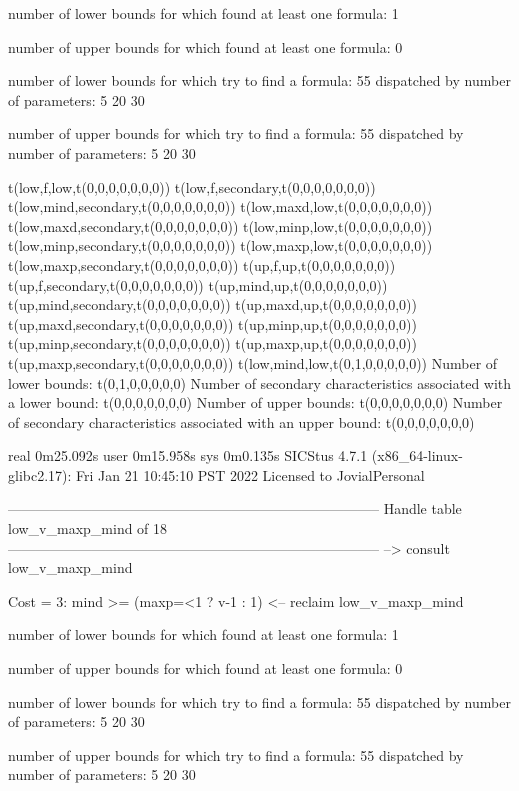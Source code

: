 number of lower bounds for which found at least one formula: 1

number of upper bounds for which found at least one formula: 0

number of lower bounds for which try to find a formula: 55
dispatched by number of parameters: 5  20  30

number of upper bounds for which try to find a formula: 55
dispatched by number of parameters: 5  20  30

t(low,f,low,t(0,0,0,0,0,0,0))
t(low,f,secondary,t(0,0,0,0,0,0,0))
t(low,mind,secondary,t(0,0,0,0,0,0,0))
t(low,maxd,low,t(0,0,0,0,0,0,0))
t(low,maxd,secondary,t(0,0,0,0,0,0,0))
t(low,minp,low,t(0,0,0,0,0,0,0))
t(low,minp,secondary,t(0,0,0,0,0,0,0))
t(low,maxp,low,t(0,0,0,0,0,0,0))
t(low,maxp,secondary,t(0,0,0,0,0,0,0))
t(up,f,up,t(0,0,0,0,0,0,0))
t(up,f,secondary,t(0,0,0,0,0,0,0))
t(up,mind,up,t(0,0,0,0,0,0,0))
t(up,mind,secondary,t(0,0,0,0,0,0,0))
t(up,maxd,up,t(0,0,0,0,0,0,0))
t(up,maxd,secondary,t(0,0,0,0,0,0,0))
t(up,minp,up,t(0,0,0,0,0,0,0))
t(up,minp,secondary,t(0,0,0,0,0,0,0))
t(up,maxp,up,t(0,0,0,0,0,0,0))
t(up,maxp,secondary,t(0,0,0,0,0,0,0))
t(low,mind,low,t(0,1,0,0,0,0,0))
Number of lower bounds:                                             t(0,1,0,0,0,0,0)
Number of secondary characteristics associated with a lower bound:  t(0,0,0,0,0,0,0)
Number of upper bounds:                                             t(0,0,0,0,0,0,0)
Number of secondary characteristics associated with an upper bound: t(0,0,0,0,0,0,0)

real	0m25.092s
user	0m15.958s
sys	0m0.135s
SICStus 4.7.1 (x86_64-linux-glibc2.17): Fri Jan 21 10:45:10 PST 2022
Licensed to JovialPersonal


--------------------------------------------------------------------------------
Handle table low_v_maxp_mind of 18
--------------------------------------------------------------------------------
--> consult low_v_maxp_mind

Cost =  3:  mind >= (maxp=<1 ? v-1 : 1)
<-- reclaim low_v_maxp_mind

number of lower bounds for which found at least one formula: 1

number of upper bounds for which found at least one formula: 0

number of lower bounds for which try to find a formula: 55
dispatched by number of parameters: 5  20  30

number of upper bounds for which try to find a formula: 55
dispatched by number of parameters: 5  20  30

